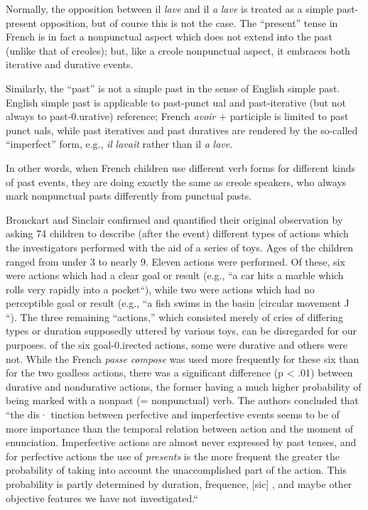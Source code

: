 Normally, the opposition between il \textit{lave} and il \textit{a} \textit{lave} is treated as a simple past-present opposition, but of course this is not the case. The ``present'' tense in French is in fact a nonpunctual aspect which does not extend into the past (unlike that of creoles); but, like a creole nonpunctual aspect, it embraces both iterative and durative events.


Similarly, the ``past'' is not a simple past in the sense of English simple past. English simple past is applicable to past-punct ual and past-iterative (but not always to past-0.urative) reference; French \textit{avoir} + participle is limited to past punct uals, while past iteratives and past duratives are rendered by the so-called ``imperfect'' form, e.g., \textit{il} \textit{lavait} rather
than il \textit{a} \textit{lave}.

In other words, when French children use different verb forms for different kinds of past events, they are doing exactly the same as creole speakers, who always mark nonpunctual pasts differently from
punctual pasts.

Bronckart and Sinclair confirmed and quantified their original observation by asking 74 children to describe (after the event) different types of actions which the investigators performed with the aid of a series of toys. Ages of the children ranged from under 3 to nearly 9. Eleven actions were performed. Of these, six were actions which had a clear goal or result (e.g., ``a car hits a marble which rolls very rapidly into a pocket``), while two were actions which had no perceptible goal
or result (e.g., ``a fish swims in the basin [circular movement J ``). The
three remaining ``actions,'' which consisted merely of cries of differing types or duration supposedly uttered by various toys, can be disregarded for our purposes.
of the six goal-0.irected actions, some were durative and others
were not. While the French \textit{passe} \textit{compose} was used more frequently for these six than for the two goalless actions, there was a significant
difference (p {\textless} .01) between durative and nondurative actions, the
former having a much higher probability of being marked with a nonpast (= nonpunctual) verb. The authors concluded that ``the dis· tinction between perfective and imperfective events seems to be of more importance than the temporal relation between action and the moment of enunciation. Imperfective actions are almost never ex\-pressed by past tenses, and for perfective actions the use of \textit{presents}
is the more frequent the greater the probability of taking into account the unaccomplished part of the action. This probability is partly determined by duration, frequence, [sic] , and maybe other objective features we have not investigated.``

